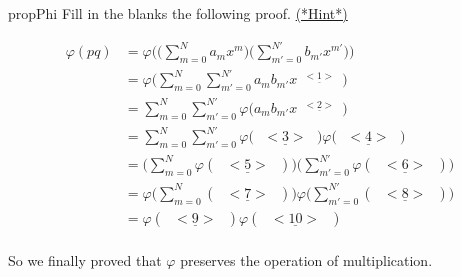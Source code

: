 \begin{exercise}{propPhi}
Fill in the blanks the following proof. \hyperref[sec:PolyVec:hints]{(*Hint*)} 

\begin{align*}
\varphi(pq) &= \varphi\Bigg(\Big(\sum^ {N}_{m=0} a_{m}x^{m}\Big)\Big( \sum^{N'}_{m'=0} b_{m'}x^{m'}\Big)\Bigg)\\
&= \varphi\Bigg(\sum^ {N}_{m=0}\sum^{N'}_{m'=0} a_{m}b_{m'} x^{\underline{\text{ $<1>$ }}} \Bigg)\\
&= \sum^ {N}_{m=0}\sum^{N'}_{m'=0}\varphi\big( a_{m}b_{m'} x^{\underline{\text{ $<2>$ }}} \big)\\
&= \sum^ {N}_{m=0}\sum^{N'}_{m'=0}\varphi\big( \underline{\text{ $<3>$ }} \big)\varphi\big(\underline{\text{ $<4>$ }}\big)\\
&= \Big(\sum^ {N}_{m=0}\varphi(\underline{\text{ $<5>$ }})\Big)\Big( \sum^{N'}_{m'=0}\varphi(\underline{\text{ $<6>$ }})\Big)\\
&= \varphi \Big(\sum^ {N}_{m=0}(\underline{\text{ $<7>$ }})\Big)\varphi\Big( \sum^{N'}_{m'=0}(\underline{\text{ $<8>$ }})\Big)\\
&= \varphi(\underline{\text{ $<9>$ }}) \varphi(\underline{\text{ $<10>$ }})\\
\end{align*}
\end{exercise}

So we finally proved that $\varphi$ preserves the operation of multiplication.\\


